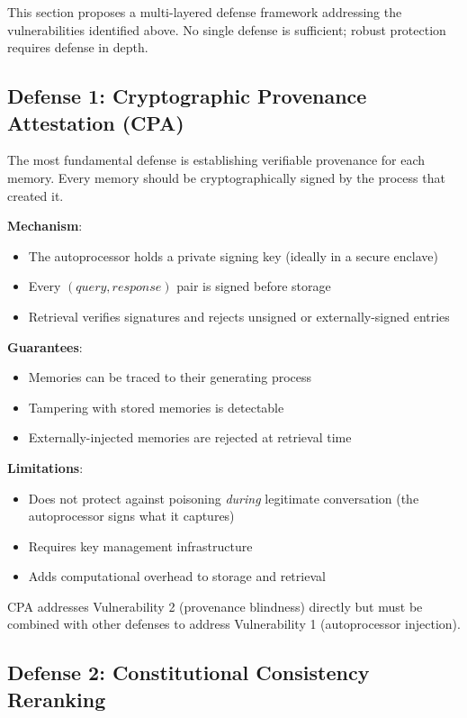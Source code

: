 This section proposes a multi-layered defense framework addressing the vulnerabilities identified above. No single defense is sufficient; robust protection requires defense in depth.

\subsection{Defense 1: Cryptographic Provenance Attestation (CPA)}

The most fundamental defense is establishing verifiable provenance for each memory. Every memory should be cryptographically signed by the process that created it.

\textbf{Mechanism}:
\begin{itemize}
    \item The autoprocessor holds a private signing key (ideally in a secure enclave)
    \item Every $(query, response)$ pair is signed before storage
    \item Retrieval verifies signatures and rejects unsigned or externally-signed entries
\end{itemize}

\textbf{Guarantees}:
\begin{itemize}
    \item Memories can be traced to their generating process
    \item Tampering with stored memories is detectable
    \item Externally-injected memories are rejected at retrieval time
\end{itemize}

\textbf{Limitations}:
\begin{itemize}
    \item Does not protect against poisoning \emph{during} legitimate conversation (the autoprocessor signs what it captures)
    \item Requires key management infrastructure
    \item Adds computational overhead to storage and retrieval
\end{itemize}

CPA addresses Vulnerability 2 (provenance blindness) directly but must be combined with other defenses to address Vulnerability 1 (autoprocessor injection).

\subsection{Defense 2: Constitutional Consistency Reranking}


